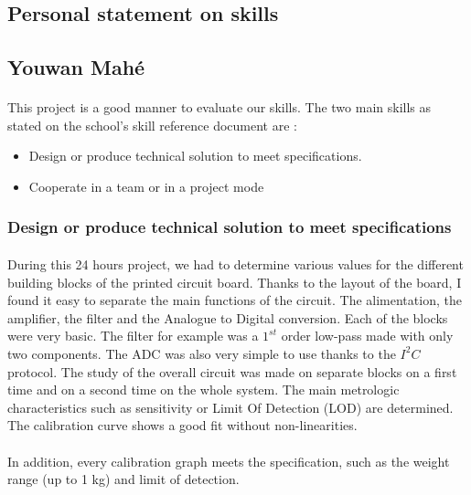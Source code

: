 \documentclass{article}[12pt]
\begin{document}
\begin{appendices}
\section{Personal statement on skills}
\subsection{Youwan Mahé}
\paragraph{}
This project is a good manner to evaluate our skills. The two main skills as stated on the school's skill reference document are :
\begin{itemize}
    \item Design or produce technical solution to meet specifications.
    \item Cooperate in a team or in a project mode
\end{itemize}
\subsubsection{Design or produce technical solution to meet specifications}
\paragraph{} 
During this 24 hours project, we had to determine various values for the different building blocks of the printed circuit board. Thanks to the layout of the board, I found it easy to separate the main functions of the circuit. The alimentation, the amplifier, the filter and the Analogue to Digital conversion. Each of the blocks were very basic. The filter for example was a $1^{st}$ order low-pass made with only two components. The ADC was also very simple to use thanks to the $I^2C$ protocol. The study of the overall circuit was made on separate blocks on a first time and on a second time on the whole system. The main metrologic characteristics such as sensitivity or Limit Of Detection (LOD) are determined. The calibration curve shows a good fit without non-linearities. 
\paragraph{}
In addition, every calibration graph meets the specification, such as the weight range (up to 1 kg) and limit of detection.

\end{appendices}
\end{document}
